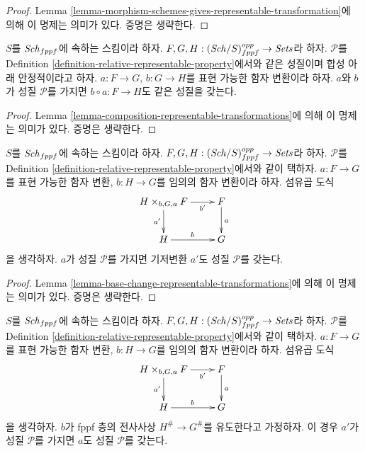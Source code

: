 \begin{proof}
Lemma \ref{lemma-morphism-schemes-gives-representable-transformation}에 의해
이 명제는 의미가 있다. 증명은 생략한다.
\end{proof}

\begin{lemma}
\label{lemma-composition-representable-transformations-property}
$S$를 $\mathit{Sch}_{fppf}$에 속하는 스킴이라 하자.
$F, G, H : (\mathit{Sch}/S)_{fppf}^{opp} \to \textit{Sets}$라 하자.
$\mathcal{P}$를 Definition
\ref{definition-relative-representable-property}에서와 같은 성질이며
합성 아래 안정적이라고 하자. $a : F \to G$, $b : G \to H$를 표현 가능한
함자 변환이라 하자. $a$와 $b$가 성질 $\mathcal{P}$를 가지면
$b \circ a : F \longrightarrow H$도 같은 성질을 갖는다.
\end{lemma}

\begin{proof}
Lemma \ref{lemma-composition-representable-transformations}에 의해 이 명제는
의미가 있다. 증명은 생략한다.
\end{proof}

\begin{lemma}
\label{lemma-base-change-representable-transformations-property}
$S$를 $\mathit{Sch}_{fppf}$에 속하는 스킴이라 하자.
$F, G, H : (\mathit{Sch}/S)_{fppf}^{opp} \to \textit{Sets}$라 하자.
$\mathcal{P}$를 Definition
\ref{definition-relative-representable-property}에서와 같이 택하자.
$a : F \to G$를 표현 가능한 함자 변환, $b : H \to G$를 임의의
함자 변환이라 하자. 섬유곱 도식
$$
\xymatrix{
H \times_{b, G, a} F \ar[r]_-{b'} \ar[d]_{a'} & F \ar[d]^a \\
H \ar[r]^b & G
}
$$
을 생각하자. $a$가 성질 $\mathcal{P}$를 가지면 기저변환 $a'$도
성질 $\mathcal{P}$를 갖는다.
\end{lemma}

\begin{proof}
Lemma \ref{lemma-base-change-representable-transformations}에 의해 이 명제는
의미가 있다. 증명은 생략한다.
\end{proof}

\begin{lemma}
\label{lemma-descent-representable-transformations-property}
$S$를 $\mathit{Sch}_{fppf}$에 속하는 스킴이라 하자.
$F, G, H : (\mathit{Sch}/S)_{fppf}^{opp} \to \textit{Sets}$라 하자.
$\mathcal{P}$를 Definition
\ref{definition-relative-representable-property}에서와 같이 택하자.
$a : F \to G$를 표현 가능한 함자 변환, $b : H \to G$를 임의의
함자 변환이라 하자. 섬유곱 도식
$$
\xymatrix{
H \times_{b, G, a} F \ar[r]_-{b'} \ar[d]_{a'} & F \ar[d]^a \\
H \ar[r]^b & G
}
$$
을 생각하자. $b$가 fppf 층의 전사사상 $H^\# \to G^\#$를 유도한다고
가정하자. 이 경우 $a'$가 성질 $\mathcal{P}$를 가지면 $a$도
성질 $\mathcal{P}$를 갖는다.
\end{lemma}

